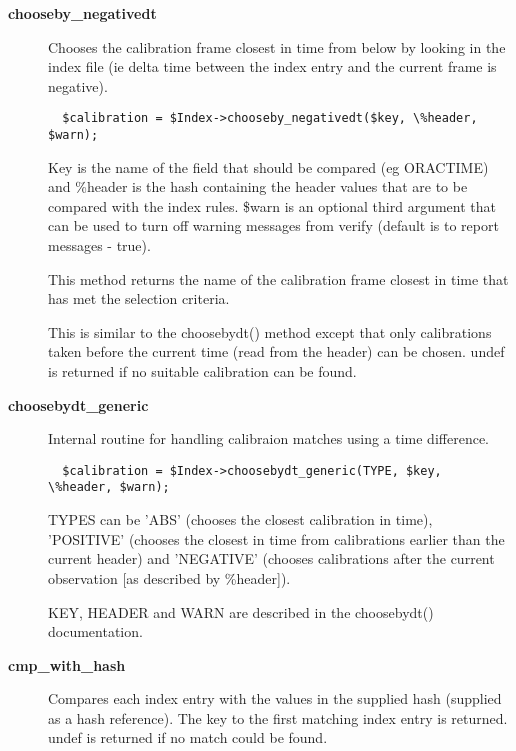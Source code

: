 \begin{description}
\item[{\textbf{chooseby\_negativedt}}] \mbox{}

Chooses the calibration frame closest in time from below by looking
in the index file (ie delta time between the index entry and the
current frame is negative).

\begin{verbatim}
  $calibration = $Index->chooseby_negativedt($key, \%header, $warn);
\end{verbatim}


Key is the name of the field that should be compared (eg ORACTIME)
and \%header is the hash containing the header values that are to
be compared with the index rules. \$warn is an optional third argument
that can be used to turn off warning messages from verify (default
is to report messages - true).



This method returns the name of the calibration frame closest in
time that has met the selection criteria.



This is similar to the choosebydt() method except that only
calibrations taken before the current time (read from the
header) can be chosen. undef is returned if no suitable
calibration can be found.


\item[{\textbf{choosebydt\_generic}}] \mbox{}

Internal routine for handling calibraion matches using a
time difference.

\begin{verbatim}
  $calibration = $Index->choosebydt_generic(TYPE, $key, \%header, $warn);
\end{verbatim}


TYPES can be 'ABS' (chooses the closest calibration in time),
'POSITIVE' (chooses the closest in time from calibrations earlier
than the current header) and 'NEGATIVE' (chooses calibrations after
the current observation [as described by \%header]).



KEY, HEADER and WARN are described in the choosebydt() documentation.


\item[{\textbf{cmp\_with\_hash}}] \mbox{}

Compares each index entry with the values in the supplied hash
(supplied as a hash reference). The key to the first matching
index entry is returned. undef is returned if no match could be
found.


\end{description}
